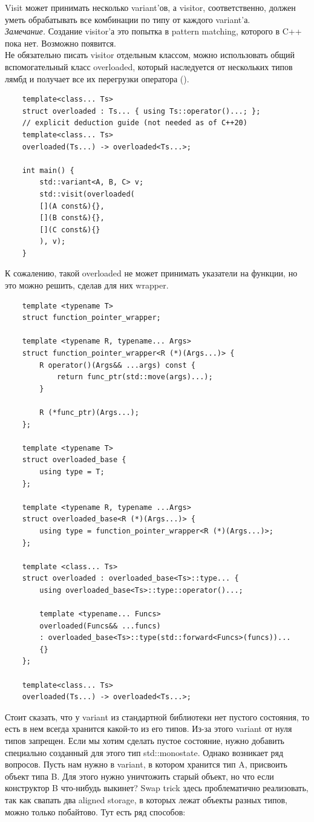 \documentclass[12pt, a4paper]{article}
\begin{document}
Visit может принимать несколько variant'ов, а visitor, соответственно, должен уметь обрабатывать все комбинации по типу от каждого variant'а.
\\\textit{Замечание.} Создание visitor'а это попытка в pattern matching, которого в C++ пока нет. Возможно появится.\\
Не обязательно писать visitor отдельным классом, можно использовать общий вспомогательный класс overloaded, который наследуется от нескольких типов лямбд и получает все их перегрузки оператора ().
\begin{verbatim}
	template<class... Ts>
	struct overloaded : Ts... { using Ts::operator()...; };
	// explicit deduction guide (not needed as of C++20)
	template<class... Ts>
	overloaded(Ts...) -> overloaded<Ts...>;
	
	int main() {
		std::variant<A, B, C> v;
		std::visit(overloaded(
		[](A const&){},
		[](B const&){},
		[](C const&){}
		), v);
	}
\end{verbatim}
К сожалению, такой overloaded не может принимать указатели на функции, но это можно решить, сделав для них wrapper.
\begin{verbatim}
	template <typename T>
	struct function_pointer_wrapper;
	
	template <typename R, typename... Args>
	struct function_pointer_wrapper<R (*)(Args...)> {
		R operator()(Args&& ...args) const {
			return func_ptr(std::move(args)...);
		}
		
		R (*func_ptr)(Args...);
	};
	
	template <typename T>
	struct overloaded_base {
		using type = T;
	};
	
	template <typename R, typename ...Args>
	struct overloaded_base<R (*)(Args...)> {
		using type = function_pointer_wrapper<R (*)(Args...)>;  
	};
	
	template <class... Ts>
	struct overloaded : overloaded_base<Ts>::type... {
		using overloaded_base<Ts>::type::operator()...;
		
		template <typename... Funcs>
		overloaded(Funcs&& ...funcs) 
		: overloaded_base<Ts>::type(std::forward<Funcs>(funcs))...
		{}
	};
	
	template<class... Ts>
	overloaded(Ts...) -> overloaded<Ts...>;
\end{verbatim}
Стоит сказать, что у variant из стандартной библиотеки нет пустого состояния, то есть в нем всегда хранится какой-то из его типов. Из-за этого variant от нуля типов запрещен. Если мы хотим сделать пустое состояние, нужно добавить специально созданный для этого тип std::monostate. Однако возникает ряд вопросов. Пусть нам нужно в variant, в котором хранится тип A, присвоить объект типа B. Для этого нужно уничтожить старый объект, но что если конструктор B что-нибудь выкинет? Swap trick здесь проблематично реализовать, так как свапать два aligned storage, в которых лежат объекты разных типов, можно только побайтово. Тут есть ряд способов:\\
\end{document}
